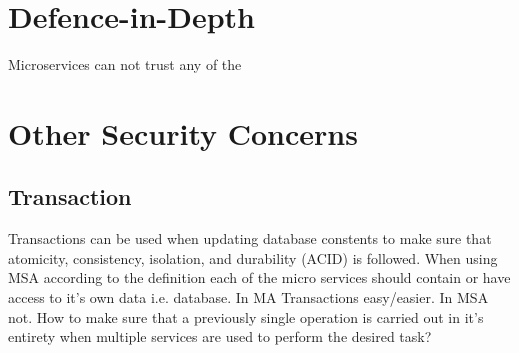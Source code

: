 %     

\section{Defence-in-Depth}
\begin{sloppypar}
    Microservices can not trust any of the \citep{otterstad}
\end{sloppypar}



\section{Other Security Concerns}

\subsection{Transaction}
\begin{sloppypar}
    Transactions can be used when updating database constents to make sure that
    atomicity, consistency, isolation, and durability (ACID) \citep{acid} is 
    followed. When using MSA according to the definition each of the micro 
    services should contain or have access to it's own data i.e. database. 
    In MA Transactions easy/easier. In MSA not. How to make sure that a 
    previously single operation is carried out in it's entirety when multiple 
    services are used to perform the desired task?
\end{sloppypar}

